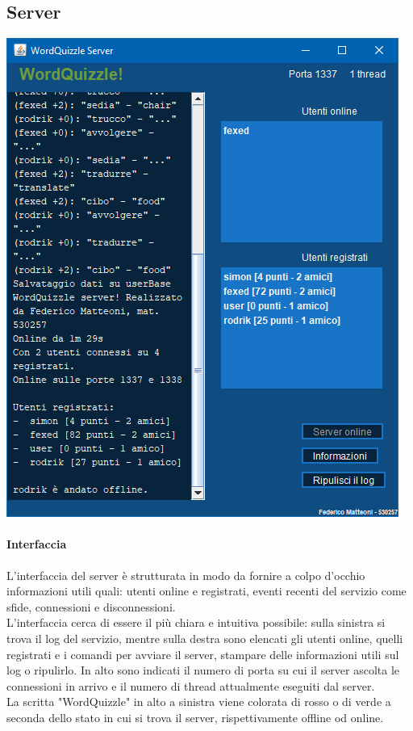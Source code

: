 \documentclass[10pt]{article}
\begin{document}
{\subsection{Server}
\begin{center}
\includegraphics[scale=0.75]{server.png}
\end{center}
\paragraph{Interfaccia} L'interfaccia del server è strutturata in modo da fornire a colpo d'occhio informazioni utili quali: utenti online e registrati, eventi recenti del servizio come sfide, connessioni e disconnessioni.\\
L'interfaccia cerca di essere il più chiara e intuitiva possibile: sulla sinistra si trova il log del servizio, mentre sulla destra sono elencati gli utenti online, quelli registrati e i comandi per avviare il server, stampare delle informazioni utili sul log o ripulirlo. In alto sono indicati il numero di porta su cui il server ascolta le connessioni in arrivo e il numero di thread attualmente eseguiti dal server.\\
La scritta "WordQuizzle" in alto a sinistra viene colorata di rosso o di verde a seconda dello stato in cui si trova il server, rispettivamente offline od online.
}
\end{document}
